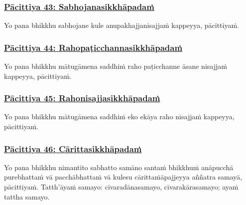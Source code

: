 \subsubsection*{\hyperref[exp43]{Pācittiya 43: Sabhojanasikkhāpadaṁ}}
\label{pac43}

Yo pana bhikkhu sabhojane kule anupakhajja\makeatletter\hyperlink{endnote314-appendix}\makeatother \thinspace nisajjaṁ kappeyya, pācittiyaṁ.



\subsubsection*{\hyperref[exp44]{Pācittiya 44: Rahopaṭicchannasikkhāpadaṁ}}
\label{pac44}

Yo pana bhikkhu mātugāmena saddhiṁ raho paṭicchanne āsane nisajjaṁ kappeyya, pācittiyaṁ.



\subsubsection*{\hyperref[exp45]{Pācittiya 45: Rahonisajjasikkhāpadaṁ}}
\label{pac45}

Yo pana bhikkhu mātugāmena saddhiṁ eko ekāya raho nisajjaṁ kappeyya, pācittiyaṁ.



\subsubsection*{\hyperref[exp46]{Pācittiya 46: Cārittasikkhāpadaṁ}}
\label{pac46}

Yo pana bhikkhu nimantito sabhatto samāno santaṁ bhikkhuṁ anāpucchā purebhattaṁ vā pacchābhattaṁ vā kulesu cārittaṁ\makeatletter\hyperlink{endnote315-appendix}\makeatother \thinspace āpajjeyya aññatra samayā, pācittiyaṁ. Tatth'āyaṁ samayo: cīvaradānasamayo, cīvarakārasamayo; ayaṁ tattha samayo.



